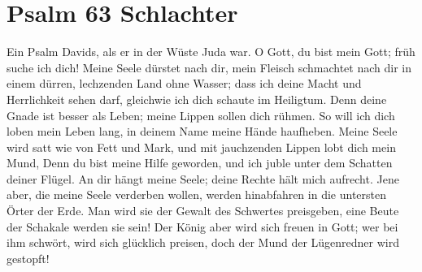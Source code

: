 \documentclass[14pt]{../../inc/mybib}
\author{Lothar Schmid}
\begin{document}
\setlength{\baselineskip}{2.5\baselineskip}
\section{Psalm 63 \small{Schlachter}}
Ein Psalm Davids, als er in der Wüste Juda war. O Gott, du bist mein Gott; früh suche ich dich! Meine Seele dürstet nach dir, mein Fleisch schmachtet nach dir in einem dürren, lechzenden Land ohne Wasser; dass ich deine Macht und Herrlichkeit sehen darf, gleichwie ich dich schaute im Heiligtum. Denn deine Gnade ist besser als Leben; meine Lippen sollen dich rühmen. So will ich dich loben mein Leben lang, in deinem Name meine Hände haufheben.  Meine Seele wird satt wie von Fett und Mark, und mit jauchzenden Lippen lobt dich mein Mund,  Denn du bist meine Hilfe geworden, und ich juble unter dem Schatten deiner Flügel. An dir hängt meine Seele; deine Rechte hält mich aufrecht.  Jene aber, die meine Seele verderben wollen, werden hinabfahren in die untersten Örter der Erde. Man wird sie der Gewalt des Schwertes preisgeben, eine Beute der Schakale werden sie sein! Der König aber wird sich freuen in Gott; wer bei ihm schwört, wird sich glücklich preisen, doch der Mund der Lügenredner wird gestopft!
\end{document}
